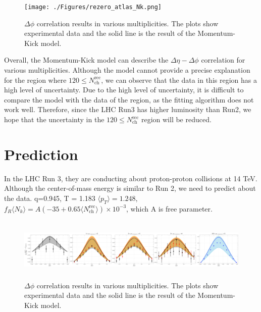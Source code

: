 \documentclass[jkps,fleqn,showpacs,showkeys]{revtex4}
\begin{document}
\begin{figure}[ht]
\centering
\texttt{[image: ./Figures/rezero\_atlas\_Nk.png]}
\caption{$\Delta \phi$ correlation results in various multiplicities.
The plots show experimental data and the solid line is the result of the Momentum-Kick model.
}
\label{figure:variousmulti}
\end{figure}

Overall, the Momentum-Kick model can describe the $\Delta\eta - \Delta\phi$ correlation for various multiplicities.
Although the model cannot provide a precise explanation for the region where $120\leq N_{\text{ch}}^{\text{rec}}$, we can observe that the data in this region has a high level of uncertainty.
Due to the high level of uncertainty, it is difficult to compare the model with the data of the region, as the fitting algorithm does not work well.
Therefore, since the LHC Run3 has higher luminosity than Run2, we hope that the uncertainty in the $120\leq N_{\text{ch}}^{\text{rec}}$ region will be reduced.



\section*{Prediction}
\label{sec:Prediction}

In the LHC Run 3, they are conducting about proton-proton collisions at 14 TeV.
Although the center-of-mass energy is similar to Run 2, we need to predict about the data.
q=0.945, T = 1.183 $\langle p_T \rangle=1.248$, $f_R \langle N_k \rangle = A(-35+0.65\langle N_{\text{ch}}^{\text{rec}}\rangle)\times10^{-3}$, which A is free parameter.

\begin{figure}[ht]
  \centering
  \includegraphics[width=18cm, height=3cm]{./Figures/Prediction_pp14TeV.png}
  \caption{$\Delta \phi$ correlation results in various multiplicities.
  The plots show experimental data and the solid line is the result of the Momentum-Kick model.
  }
  \label{figure:pp14prediction}
\end{figure}
\end{document}
